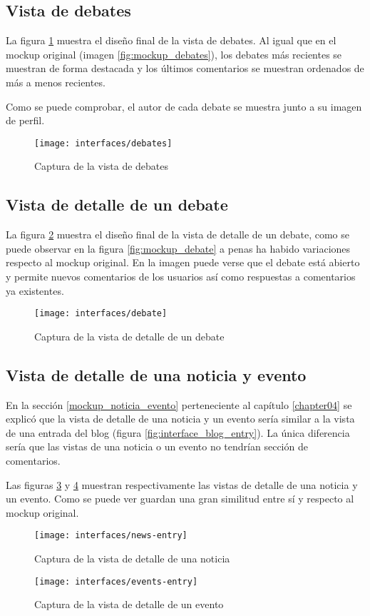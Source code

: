 \subsection{Vista de debates}
La figura \ref{fig:interface_debates} muestra el diseño final de la vista de debates. Al igual que en el mockup original (imagen \ref{fig:mockup_debates}), los debates más recientes se muestran de forma destacada y los últimos comentarios se muestran ordenados de más a menos recientes.

Como se puede comprobar, el autor de cada debate se muestra junto a su imagen de perfil.
\begin{figure}[h]
	\centering
	\texttt{[image: interfaces/debates]}
	\caption{Captura de la vista de debates}
	\label{fig:interface_debates}
\end{figure}


\subsection{Vista de detalle de un debate}
La figura \ref{fig:interface_debate} muestra el diseño final de la vista de detalle de un debate,  como se puede observar en la figura \ref{fig:mockup_debate} a penas ha habido variaciones respecto al mockup original.  En la imagen puede verse que el debate está abierto y permite nuevos comentarios de los usuarios así como respuestas a comentarios ya existentes.

\begin{figure}[h]
	\centering
	\texttt{[image: interfaces/debate]}
	\caption{Captura de la vista de detalle de un debate}
	\label{fig:interface_debate}
\end{figure}


\subsection{Vista de detalle de una noticia y evento}
En la sección \ref{mockup_noticia_evento} perteneciente al capítulo \ref{chapter04} se explicó que la vista de detalle de una noticia y un evento sería similar a la vista de una entrada del blog (figura \ref{fig:interface_blog_entry}).  La única diferencia sería que las vistas de una noticia o un evento no tendrían sección de comentarios.

Las figuras \ref{fig:interface_noticia} y \ref{fig:interface_evento} muestran respectivamente las vistas de detalle de una noticia y un evento.  Como se puede ver guardan una gran similitud entre sí y respecto al mockup original. 
\begin{figure}[h]
	\centering
	\texttt{[image: interfaces/news-entry]}
	\caption{Captura de la vista de detalle de una noticia}
	\label{fig:interface_noticia}
\end{figure}
\begin{figure}[h]
	\centering
	\texttt{[image: interfaces/events-entry]}
	\caption{Captura de la vista de detalle de un evento}
	\label{fig:interface_evento}
\end{figure}


